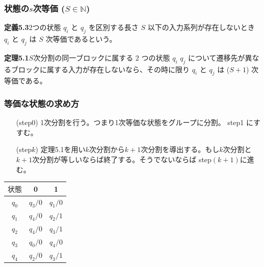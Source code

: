 \documentclass[a4j,10pt,oneside,openany,fleqn]{jsbook}
\begin{document}
\subsubsection{状態の$s$次等価 ($S \in \mathbb{N}$)}
\textbf{定義5.3}2つの状態 $q_i$ と $q_j$ を区別する長さ $S$ 以下の入力系列が存在しないとき $q_i$ と $q_j$ は $S$ 次等価であるという。

\textbf{定理5.1}$S$次分割の同一ブロックに属する $2$ つの状態 $q_i$ $q_j$ について遷移先が異なるブロックに属する入力が存在しないなら、その時に限り $q_i$ と $q_j$ は ($S+1$) 次等価である。

\subsubsection{等価な状態の求め方}
\begin{enumerate}
\item[(step0)] 1次分割を行う。つまり1次等価な状態をグループに分割。 step1 にすすむ。
\item[(step$k$)]定理5.1を用い$k$次分割から$k+1$次分割を導出する。もし$k$次分割と$k+1$次分割が等しいならば終了する。そうでないならば step$(k+1)$に進む。  
\end{enumerate}

\begin{table}[htb]
  \begin{center}
    \begin{tabular}{c|cc} 
      $状態$ & 0 & 1 \\ \hline 
      $q_0$ & $q_3 / 0$ & $q_1 /0 $ \\
      $q_1$ & $q_4 / 0$ & $q_2 /1 $ \\
      $q_2$ & $q_4 / 0$ & $q_3 /1 $ \\
      $q_3$ & $q_0 / 0$ & $q_4 /0 $ \\
      $q_4$ & $q_2 / 0$ & $q_3 /1 $ \\
    \end{tabular}
  \end{center}
\end{table}
\end{document}
